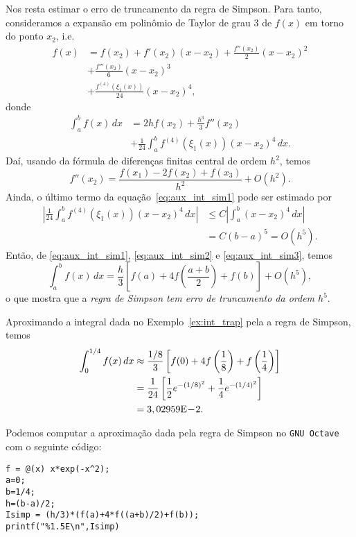 Nos resta estimar o erro de truncamento da regra de Simpson. Para tanto, consideramos a expansão em polinômio de Taylor de grau 3 de $f(x)$ em torno do ponto $x_2$, i.e.
\begin{align}
  f(x) &= f(x_2) + f'(x_2)(x-x_2) + \frac{f''(x_2)}{2}(x-x_2)^2 \nonumber\\
  &+ \frac{f'''(x_2)}{6}(x-x_2)^3 \nonumber\\
  &+ \frac{f^{(4)}(\xi_1(x))}{24}(x-x_2)^4,
\end{align}
donde
\begin{align}
  \int_a^b f(x)\,dx &= 2hf(x_2) + \frac{h^3}{3}f''(x_2) \nonumber\\
  &+ \frac{1}{24}\int_a^bf^{(4)}(\xi_1(x))(x-x_2)^4\,dx.\label{eq:aux_int_sim1}
\end{align}
Daí, usando da fórmula de diferenças finitas central de ordem $h^2$, temos
\begin{equation}\label{eq:aux_int_sim2}
  f''(x_2) = \frac{f(x_1) - 2f(x_2) + f(x_3)}{h^2} + O(h^2).
\end{equation}
Ainda, o último termo da equação~\eqref{eq:aux_int_sim1} pode ser estimado por
\begin{align}
  \left|\frac{1}{24}\int_a^bf^{(4)}(\xi_1(x))(x-x_2)^4\,dx\right| &\leq C\left|\int_a^b (x-x_2)^4\,dx\right|\\
  &= C(b-a)^5 = O(h^5).\label{eq:aux_int_sim3}
\end{align}\label{eq:aux_int_sim3}
Então, de \eqref{eq:aux_int_sim1}, \eqref{eq:aux_int_sim2} e \eqref{eq:aux_int_sim3}, temos
\begin{equation}
  \int_a^b f(x)\,dx = \frac{h}{3}\left[f(a) + 4f\left(\frac{a+b}{2}\right) + f(b)\right] + O(h^5),
\end{equation}
o que mostra que a \emph{regra de Simpson tem erro de truncamento da ordem $h^5$}.

\begin{ex}\label{ex:int_simp}
  Aproximando a integral dada no Exemplo~\ref{ex:int_trap} pela a regra de Simpson, temos
  \begin{align}
    \int_0^{1/4} f(x)\,dx &\approx \frac{1/8}{3}\left[f(0) + 4f\left(\frac{1}{8}\right) + f\left(\frac{1}{4}\right)\right]\\
    &= \frac{1}{24}\left[\frac{1}{2}e^{-(1/8)^2} + \frac{1}{4}e^{-(1/4)^2}\right]\\
    &= 3,02959\mathrm{E}\!-\!2.
  \end{align}

\ifisoctave
Podemos computar a aproximação dada pela regra de Simpson no \verb+GNU Octave+ com o seguinte código:
\begin{verbatim}
f = @(x) x*exp(-x^2);
a=0;
b=1/4;
h=(b-a)/2;
Isimp = (h/3)*(f(a)+4*f((a+b)/2)+f(b));
printf("%1.5E\n",Isimp)
\end{verbatim}
\fi
\end{ex}

